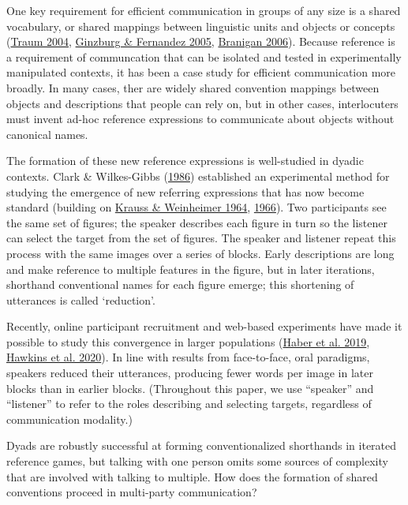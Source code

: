 \documentclass[
  english,
  a4paper,
]{article}
\begin{document}
One key requirement for efficient communication in groups of any size is a shared vocabulary, or shared mappings between linguistic units and objects or concepts (\protect\hyperlink{ref-traum2004}{Traum 2004}, \protect\hyperlink{ref-ginzburg2005}{Ginzburg \& Fernandez 2005}, \protect\hyperlink{ref-branigan2006}{Branigan 2006}). Because reference is a requirement of communcation that can be isolated and tested in experimentally manipulated contexts, it has been a case study for efficient communication more broadly. In many cases, ther are widely shared convention mappings between objects and descriptions that people can rely on, but in other cases, interlocuters must invent ad-hoc reference expressions to communicate about objects without canonical names.

The formation of these new reference expressions is well-studied in dyadic contexts. Clark \& Wilkes-Gibbs (\protect\hyperlink{ref-clarkReferringCollaborativeProcess1986}{1986}) established an experimental method for studying the emergence of new referring expressions that has now become standard (building on \protect\hyperlink{ref-kraussChangesReferencePhrases1964}{Krauss \& Weinheimer 1964}, \protect\hyperlink{ref-kraussConcurrentFeedbackConfirmation1966}{1966}). Two participants see the same set of figures; the speaker describes each figure in turn so the listener can select the target from the set of figures. The speaker and listener repeat this process with the same images over a series of blocks. Early descriptions are long and make reference to multiple features in the figure, but in later iterations, shorthand conventional names for each figure emerge; this shortening of utterances is called `reduction'.

Recently, online participant recruitment and web-based experiments have made it possible to study this convergence in larger populations (\protect\hyperlink{ref-haber2019}{Haber et al. 2019}, \protect\hyperlink{ref-hawkinsCharacterizingDynamicsLearning2020}{Hawkins et al. 2020}). In line with results from face-to-face, oral paradigms, speakers reduced their utterances, producing fewer words per image in later blocks than in earlier blocks. (Throughout this paper, we use ``speaker'' and ``listener'' to refer to the roles describing and selecting targets, regardless of communication modality.)

Dyads are robustly successful at forming conventionalized shorthands in iterated reference games, but talking with one person omits some sources of complexity that are involved with talking to multiple. How does the formation of shared conventions proceed in multi-party communication?
\end{document}
